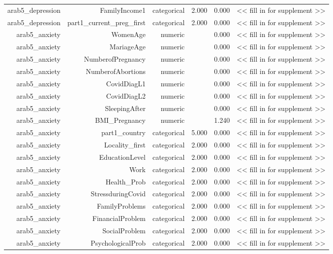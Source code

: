 \documentclass[10pt]{article}
\begin{document}
\begin{longtable}{rrrrrr}
arab5\_depression & FamilyIncome1 & categorical & 2.000 & 0.000 & << fill in for supplement >> \\
arab5\_depression & part1\_current\_preg\_first & categorical & 2.000 & 0.000 & << fill in for supplement >> \\
arab5\_anxiety & WomenAge & numeric &  & 0.000 & << fill in for supplement >> \\
arab5\_anxiety & MariageAge & numeric &  & 0.000 & << fill in for supplement >> \\
arab5\_anxiety & NumberofPregnancy & numeric &  & 0.000 & << fill in for supplement >> \\
arab5\_anxiety & NumberofAbortions & numeric &  & 0.000 & << fill in for supplement >> \\
arab5\_anxiety & CovidDiagL1 & numeric &  & 0.000 & << fill in for supplement >> \\
arab5\_anxiety & CovidDiagL2 & numeric &  & 0.000 & << fill in for supplement >> \\
arab5\_anxiety & SleepingAfter & numeric &  & 0.000 & << fill in for supplement >> \\
arab5\_anxiety & BMI\_Pregnancy & numeric &  & 1.240 & << fill in for supplement >> \\
arab5\_anxiety & part1\_country & categorical & 5.000 & 0.000 & << fill in for supplement >> \\
arab5\_anxiety & Locality\_first & categorical & 2.000 & 0.000 & << fill in for supplement >> \\
arab5\_anxiety & EducationLevel & categorical & 2.000 & 0.000 & << fill in for supplement >> \\
arab5\_anxiety & Work & categorical & 2.000 & 0.000 & << fill in for supplement >> \\
arab5\_anxiety & Health\_Prob & categorical & 2.000 & 0.000 & << fill in for supplement >> \\
arab5\_anxiety & StressduringCovid & categorical & 2.000 & 0.000 & << fill in for supplement >> \\
arab5\_anxiety & FamilyProblems & categorical & 2.000 & 0.000 & << fill in for supplement >> \\
arab5\_anxiety & FinancialProblem & categorical & 2.000 & 0.000 & << fill in for supplement >> \\
arab5\_anxiety & SocialProblem & categorical & 2.000 & 0.000 & << fill in for supplement >> \\
arab5\_anxiety & PsychologicalProb & categorical & 2.000 & 0.000 & << fill in for supplement >> \\

\end{longtable}
\end{document}

